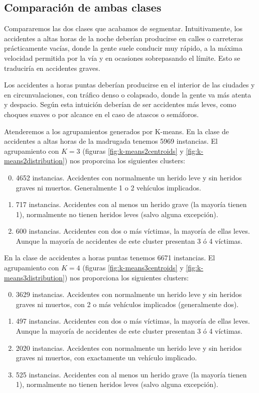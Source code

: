\documentclass[oneside]{book}
\begin{document}
\subsection{Comparación de ambas clases}

Compararemos las dos clases que acabamos de segmentar. Intuitivamente,
los accidentes a altas horas de la noche deberían producirse en calles
o carreteras prácticamente vacías, donde la gente suele conducir muy
rápido, a la máxima velocidad permitida por la vía y en ocasiones
sobrepasando el límite. Esto se traduciría en accidentes graves.

Los accidentes a horas puntas deberían producirse en el interior de
las ciudades y en circunvalaciones, con tráfico denso o colapsado,
donde la gente va más atenta y despacio. Según esta intuición deberían
de ser accidentes más leves, como choques suaves o por alcance en el
caso de atascos o semáforos.

Atenderemos a los agrupamientos generados por K-means. En la clase de
accidentes a altas horas de la madrugada tenemos 5969 instancias. El
agrupamiento con $K=3$ (figuras \ref{fig:k-means2centroids} y
\ref{fig:k-means2distribution}) nos proporcina los siguientes
clusters:
\begin{enumerate}\setcounter{enumi}{-1}
\item 4652 instancias. Accidentes con normalmente un herido leve y sin
  heridos graves ni muertos. Generalmente 1 o 2 vehículos
  implicados.
\item 717 instancias. Accidentes con al menos un herido grave (la
  mayoría tienen 1), normalmente no tienen heridos leves (salvo alguna
  excepción).
\item 600 instancias. Accidentes con dos o más víctimas, la mayoría de
  ellas leves. Aunque la mayoría de accidentes de este cluster
  presentan 3 ó 4 víctimas.
\end{enumerate}

En la clase de accidentes a horas puntas tenemos 6671 instancias. El
agrupamiento con $K=4$ (figuras \ref{fig:k-means3centroids} y
\ref{fig:k-means3distribution}) nos proporciona los siguientes
clusters:
\begin{enumerate}\setcounter{enumi}{-1}
\item 3629 instancias. Accidentes con normalmente un herido leve y sin
  heridos graves ni muertos, con 2 o más vehículos implicados
  (generalmente dos).
\item 497 instancias. Accidentes con dos o más víctimas, la mayoría de
  ellas leves. Aunque la mayoría de accidentes de este cluster
  presentan 3 ó 4 víctimas.
\item 2020 instancias. Accidentes con normalmente un herido leve y sin
  heridos graves ni muertos, con exactamente un vehículo implicado.  
\item 525 instancias. Accidentes con al menos un herido grave (la
  mayoría tienen 1), normalmente no tienen heridos leves (salvo alguna
  excepción). 
\end{enumerate}
\end{document}
